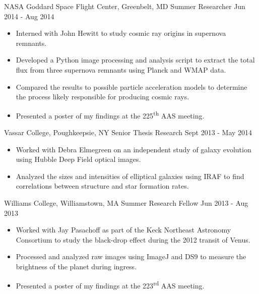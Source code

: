 \documentclass[]{awesome-cv}
\begin{document}
\begin{cventries}
	\vspace{-6mm}
	\cventry
	{NASA Goddard Space Flight Center, Greenbelt, MD}
	{Summer Researcher}
	{Jun 2014 - Aug 2014}
	{}
	{\vspace{-3mm}
		\begin{itemize}
			\item Interned with John Hewitt to study cosmic ray origins in supernova remnants. \vspace{0.7mm}
			\item Developed a Python image processing and analysis script to extract the total flux from three supernova remnants using Planck and WMAP data. \vspace{0.7mm}
			\item Compared the results to possible particle acceleration models to determine the process likely responsible for producing cosmic rays. \vspace{0.7mm}
			\item Presented a poster of my findings at the 225\textsuperscript{th} AAS meeting. 
		\end{itemize}
	}
	
	
	\vspace{-6mm}
	\cventry
	{Vassar College, Poughkeepsie, NY}
	{Senior Thesis Research}
	{Sept 2013 - May 2014}
	{}
	{\vspace{-3mm}
		\begin{itemize}
			\item Worked with Debra Elmegreen on an independent study of galaxy evolution using Hubble Deep Field optical images. \vspace{0.7mm}
			\item Analyzed the sizes and intensities of elliptical galaxies using IRAF to find correlations between structure and star formation rates. 
		\end{itemize}
	}
	
	\vspace{-6mm}
	\cventry
	{Williams College, Williamstown, MA}
	{Summer Research Fellow}
	{Jun 2013 - Aug 2013}
	{}
	{\vspace{-3mm}
		\begin{itemize}
			\item Worked with Jay Pasachoff as part of the Keck Northeast Astronomy Consortium to study the black-drop effect during the 2012 transit of Venus. \vspace{0.7mm}
			\item Processed and analyzed raw images using ImageJ and DS9 to measure the brightness of the planet during ingress. \vspace{0.7mm}
			\item Presented a poster of my findings at the 223\textsuperscript{rd} AAS meeting. 
	\end{itemize}}
\end{cventries}
\end{document}
